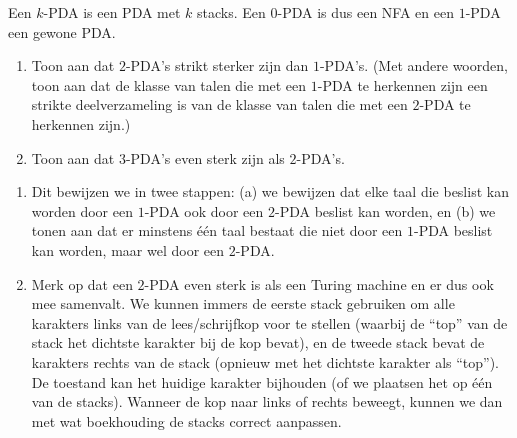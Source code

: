 \documentclass[a4paper]{article}
\begin{document}
\begin{question}
Een $k$-PDA is een PDA met $k$ stacks. Een $0$-PDA is dus een NFA en een $1$-PDA een gewone PDA. 
\begin{enumerate}
  \item Toon aan dat $2$-PDA's strikt sterker zijn dan $1$-PDA's. (Met andere woorden, toon aan dat de klasse van talen die met een $1$-PDA te herkennen zijn een strikte deelverzameling is van de klasse van talen die met een $2$-PDA te herkennen zijn.)
  \item Toon aan dat $3$-PDA's even sterk zijn als $2$-PDA's.
\end{enumerate}
\end{question}
\begin{answer}
\begin{enumerate}
\item Dit bewijzen we in twee stappen: (a) we bewijzen dat elke taal die beslist kan worden door een $1$-PDA ook door een $2$-PDA beslist kan worden, en (b) we tonen aan dat er minstens \'e\'en taal bestaat die niet door een $1$-PDA beslist kan worden, maar wel door een $2$-PDA.
\item 
\begin{note}
Merk op dat een $2$-PDA even sterk is als een Turing machine en er dus ook mee samenvalt. We kunnen immers de eerste stack gebruiken om alle karakters links van de lees/schrijfkop voor te stellen (waarbij de ``top'' van de stack het dichtste karakter bij de kop bevat), en de tweede stack bevat de karakters rechts van de stack (opnieuw met het dichtste karakter als ``top''). De toestand kan het huidige karakter bijhouden (of we plaatsen het op \'e\'en van de stacks). Wanneer de kop naar links of rechts beweegt, kunnen we dan met wat boekhouding de stacks correct aanpassen.
\end{note}
\end{enumerate}
\end{answer}
\end{document}
